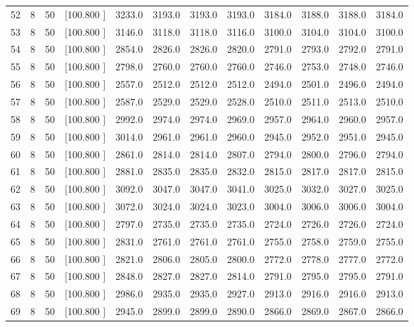 \documentclass[12pt,a4paper]{article}
\begin{document}
\begin{center}
{\begin{tabular}{r r r r r r r r r r r r}
  52&  8& 50&[100.800   ]&  3233.0&  3193.0&  3193.0&  3193.0&  3184.0&  3188.0&  3188.0&  3184.0\\[-0.02in]
  53&  8& 50&[100.800   ]&  3146.0&  3118.0&  3118.0&  3116.0&  3100.0&  3104.0&  3104.0&  3100.0\\[-0.02in]
  54&  8& 50&[100.800   ]&  2854.0&  2826.0&  2826.0&  2820.0&  2791.0&  2793.0&  2792.0&  2791.0\\[-0.02in]
  55&  8& 50&[100.800   ]&  2798.0&  2760.0&  2760.0&  2760.0&  2746.0&  2753.0&  2748.0&  2746.0\\[-0.02in]
  56&  8& 50&[100.800   ]&  2557.0&  2512.0&  2512.0&  2512.0&  2494.0&  2501.0&  2496.0&  2494.0\\[-0.02in]
  57&  8& 50&[100.800   ]&  2587.0&  2529.0&  2529.0&  2528.0&  2510.0&  2511.0&  2513.0&  2510.0\\[-0.02in]
  58&  8& 50&[100.800   ]&  2992.0&  2974.0&  2974.0&  2969.0&  2957.0&  2964.0&  2960.0&  2957.0\\[-0.02in]
  59&  8& 50&[100.800   ]&  3014.0&  2961.0&  2961.0&  2960.0&  2945.0&  2952.0&  2951.0&  2945.0\\[-0.02in]
  60&  8& 50&[100.800   ]&  2861.0&  2814.0&  2814.0&  2807.0&  2794.0&  2800.0&  2796.0&  2794.0\\[-0.02in]
  61&  8& 50&[100.800   ]&  2881.0&  2835.0&  2835.0&  2832.0&  2815.0&  2817.0&  2817.0&  2815.0\\[-0.02in]
  62&  8& 50&[100.800   ]&  3092.0&  3047.0&  3047.0&  3041.0&  3025.0&  3032.0&  3027.0&  3025.0\\[-0.02in]
  63&  8& 50&[100.800   ]&  3072.0&  3024.0&  3024.0&  3023.0&  3004.0&  3006.0&  3006.0&  3004.0\\[-0.02in]
  64&  8& 50&[100.800   ]&  2797.0&  2735.0&  2735.0&  2735.0&  2724.0&  2726.0&  2726.0&  2724.0\\[-0.02in]
  65&  8& 50&[100.800   ]&  2831.0&  2761.0&  2761.0&  2761.0&  2755.0&  2758.0&  2759.0&  2755.0\\[-0.02in]
  66&  8& 50&[100.800   ]&  2821.0&  2806.0&  2805.0&  2800.0&  2772.0&  2778.0&  2777.0&  2772.0\\[-0.02in]
  67&  8& 50&[100.800   ]&  2848.0&  2827.0&  2827.0&  2814.0&  2791.0&  2795.0&  2795.0&  2791.0\\[-0.02in]
  68&  8& 50&[100.800   ]&  2986.0&  2935.0&  2935.0&  2927.0&  2913.0&  2916.0&  2916.0&  2913.0\\[-0.02in]
  69&  8& 50&[100.800   ]&  2945.0&  2899.0&  2899.0&  2890.0&  2866.0&  2869.0&  2867.0&  2866.0\\[-0.02in]

\end{tabular}}
\end{center}
\end{document}
